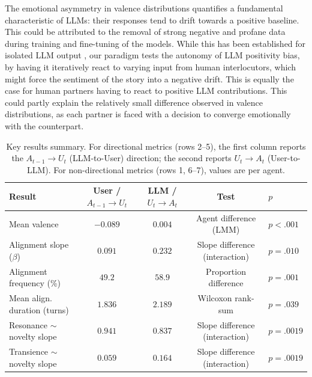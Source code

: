 \documentclass[11pt]{article}
\begin{document}
The emotional asymmetry in valence distributions quantifies a fundamental characteristic of LLMs: their responses tend to drift towards a positive baseline. This could be attributed to the removal of strong negative and profane data during training and fine-tuning of the models. While this has been established for isolated LLM output \cite{munoz2024contrasting,zanotto2024human}, our paradigm tests the autonomy of LLM positivity bias, by having it iteratively react to varying input from human interlocutors, which might force the sentiment of the story into a negative drift. This is equally the case for human partners having to react to positive LLM contributions. This could partly explain the relatively small difference observed in valence distributions, as each partner is faced with a decision to converge emotionally with the counterpart.
\begin{table}[t]
\centering
\footnotesize
\setlength{\tabcolsep}{10pt}
\renewcommand{\arraystretch}{1.15}
\begin{tabular}{lcccl}
\toprule
\textbf{Result}& 
\textbf{User / $A_{t-1}{\to}U_t$}& \textbf{LLM / $U_t{\to}A_t$}& \textbf{Test} & \textbf{$p$} \\
\midrule
Mean valence & $-0.089$ & $0.004$ & Agent difference (LMM) & $p < .001$ \\
Alignment slope ($\beta$) & $0.091$ & $0.232$ & Slope difference (interaction) & $p = .010$ \\
Alignment frequency (\%) & $49.2$ & $58.9$ & Proportion difference & $p = .001$\\
Mean align. duration (turns) & $1.836$ & $2.189$ & Wilcoxon rank-sum & $p = .039$ \\
\midrule
Resonance $\sim$ novelty slope & $0.941$ & $0.837$ & Slope difference (interaction) & $p = .0019$ \\
Transience $\sim$ novelty slope & $0.059$ & $0.164$ & Slope difference (interaction) & $p = .0019$ \\
\bottomrule
\end{tabular}
\caption{Key results summary. For directional metrics (rows 2--5), the first column reports the $A_{t-1}{\to}U_t$ (LLM-to-User) direction; the second reports $U_t{\to}A_t$ (User-to-LLM). For non-directional metrics (rows 1, 6--7), values are per agent.}
\label{tab:key_results_user_llm_tests}
\end{table}
\end{document}
